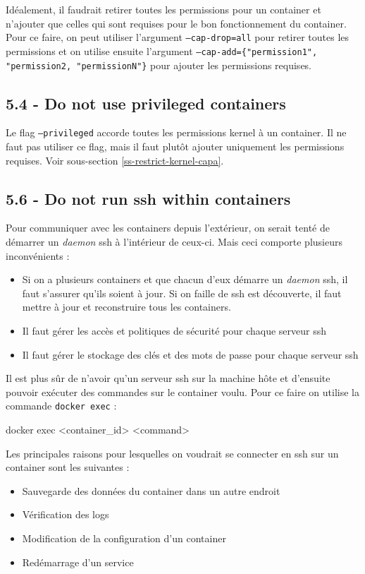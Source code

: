 \documentclass[11pt,a4paper,oneside]{report}
\newcommand{\code}[1]{\texttt{#1}}
\begin{document}
Idéalement, il faudrait retirer toutes les permissions pour un container et n'ajouter que celles qui sont requises pour le bon fonctionnement du container. Pour ce faire, on peut utiliser l'argument \code{--cap-drop=all} pour retirer toutes les permissions et on utilise ensuite l'argument \code{--cap-add=\{"permission1", "permission2, "permissionN"\}} pour ajouter les permissions requises.

\subsection{5.4  - Do not use privileged containers}
Le flag \code{--privileged} accorde toutes les permissions kernel à un container. Il ne faut pas utiliser ce flag, mais il faut plutôt ajouter uniquement les permissions requises. Voir sous-section \ref{ss-restrict-kernel-capa}.

\subsection{5.6  - Do not run ssh within containers}
Pour communiquer avec les containers depuis l'extérieur, on serait tenté de démarrer un \textit{daemon} ssh à l'intérieur de ceux-ci. Mais ceci comporte plusieurs inconvénients :

\begin{itemize}
\item Si on a plusieurs containers et que chacun d'eux démarre un \textit{daemon} ssh, il faut s'assurer qu'ils soient à jour. Si on faille de ssh est découverte, il faut mettre à jour et reconstruire tous les containers.
\item Il faut gérer les accès et politiques de sécurité pour chaque serveur ssh
\item Il faut gérer le stockage des clés et des mots de passe pour chaque serveur ssh
\end{itemize}

Il est plus sûr de n'avoir qu'un serveur ssh sur la machine hôte et d'ensuite pouvoir exécuter des commandes sur le container voulu. Pour ce faire on utilise la commande \code{docker exec} :

\begin{textcode}
docker exec <container_id> <command> 
\end{textcode}

Les principales raisons pour lesquelles on voudrait se connecter en ssh sur un container sont les suivantes :
\begin{itemize}
\item Sauvegarde des données du container dans un autre endroit
\item Vérification des logs
\item Modification de la configuration d'un container
\item Redémarrage d'un service
\end{itemize}
\end{document}
